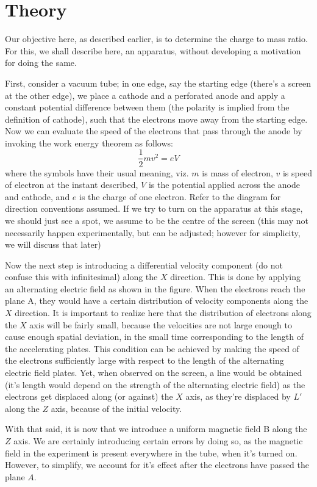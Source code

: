 \section{Theory}
	Our objective here, as described earlier, is to determine the charge to mass ratio. For this, we shall describe here, an apparatus, without developing a motivation for doing the same.
	\par
	First, consider a vacuum tube; in one edge, say the starting edge (there's a screen at the other edge), we place a cathode and a perforated anode and apply a constant potential difference between them (the polarity is implied from the definition of cathode), such that the electrons move away from the starting edge. Now we can evaluate the speed of the electrons that pass through the anode by invoking the work energy theorem as follows:
	\begin{equation}
		\frac 1 2 mv^2 = eV
	\end{equation}
	where the symbols have their usual meaning, viz. $m$ is mass of electron, $v$ is speed of electron at the instant described, $V$ is the potential applied across the anode and cathode, and $e$ is the charge of one electron. Refer to the diagram for direction conventions assumed. If we try to turn on the apparatus at this stage, we should just see a spot, we assume to be the centre of the screen (this may not necessarily happen experimentally, but can be adjusted; however for simplicity, we will discuss that later)
	\par
	Now the next step is introducing a differential velocity component (do not confuse this with infinitesimal) along the $X$ direction. This is done by applying an alternating electric field as shown in the figure. When the electrons reach the plane A, they would have a certain distribution of velocity components along the $X$ direction. It is important to realize here that the distribution of electrons along the $X$ axis will be fairly small, because the velocities are not large enough to cause enough spatial deviation, in the small time corresponding to the length of the accelerating plates. This condition can be achieved by making the speed of the electrons sufficiently large with respect to the length of the alternating electric field plates. Yet, when observed on the screen, a line would be obtained (it's length would depend on the strength of the alternating electric field) as the electrons get displaced along (or against) the $X$ axis, as they're displaced by $L'$ along the $Z$ axis, because of the initial velocity.
	\par
	With that said, it is now that we introduce a uniform magnetic field B along the $Z$ axis. We are certainly introducing certain errors by doing so, as the magnetic field in the experiment is present everywhere in the tube, when it's turned on. However, to simplify, we account for it's effect after the electrons have passed the plane $A$.

